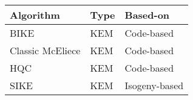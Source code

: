 \begin{tabular}{|l|l|l|}
  \hline
  Algorithm & Type & Based-on \\
  \hline
  BIKE & KEM & Code-based \\
  Classic McEliece & KEM & Code-based \\
  HQC & KEM & Code-based \\
  SIKE & KEM & Isogeny-based \\
  \hline
\end{tabular}